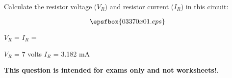 

Calculate the resistor voltage ($V_R$) and resistor current ($I_R$) in this circuit:

$$\epsfbox{03370x01.eps}$$

$V_R$ = \hskip 150pt $I_R$ = 







$V_R$ = 7 volts \hskip 100pt $I_R$ = 3.182 mA







{\bf This question is intended for exams only and not worksheets!}.




